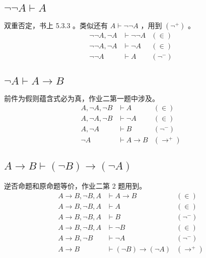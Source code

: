 \documentclass[UTF8]{ctexart}
\begin{document}
    
    \subsection*{$\lnot \lnot A \vdash A$}
    双重否定，书上 5.3.3 。类似还有 $A \vdash \lnot \lnot A$ ，用到 $(\lnot^{+})$ 。
    \begin{align*}
        \lnot \lnot A, \lnot A & \vdash \lnot \lnot A & (\in) \\
        \lnot \lnot A, \lnot A & \vdash \lnot A & (\in) \\
        \lnot \lnot A & \vdash A & (\lnot^{-})
    \end{align*}
    \subsection*{$\lnot A \vdash A \to B$}
    前件为假则蕴含式必为真，作业二第一题中涉及。
    \begin{align*}
        A, \lnot A, \lnot B & \vdash A & (\in) \\
        A, \lnot A, \lnot B & \vdash \lnot A & (\in) \\
        A, \lnot A & \vdash B & (\lnot^{-}) \\
        \lnot A & \vdash A \to B & (\to^{+})
    \end{align*}

    \subsection*{$A \to B \vdash (\lnot B) \to (\lnot A)$}
    逆否命题和原命题等价，作业二第 2 题用到。
    \begin{align*}
        A \to B, \lnot B, A & \vdash A \to B & (\in) \\
        A \to B, \lnot B, A & \vdash A & (\in) \\
        A \to B, \lnot B, A & \vdash B & (\lnot^{-}) \\
        A \to B, \lnot B, A & \vdash \lnot B & (\in) \\
        A \to B, \lnot B & \vdash \lnot A & (\lnot^{-}) \\
        A \to B & \vdash (\lnot B) \to (\lnot A) & (\to^{+})
    \end{align*}
\end{document}
